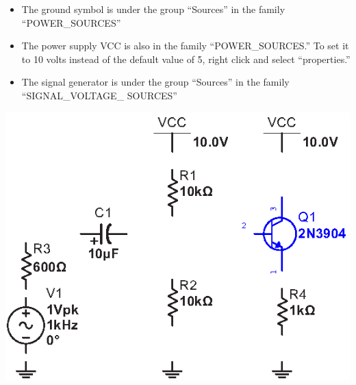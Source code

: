 \begin{enumerate}[wide]
\begin{itemize}
\item The ground symbol is under the group ``Sources'' in the family ``POWER\_SOURCES''

\item The power supply VCC is also in the family ``POWER\_SOURCES.''  To set it to 10 volts instead of the default value of 5, right click and select ``properties.''

\item The signal generator is under the group ``Sources'' in the family ``SIGNAL\_VOLTAGE\_ SOURCES''

\end{itemize}
\begin{center}
\includegraphics{multisim/more_components.eps}
\end{center}


\end{enumerate}

